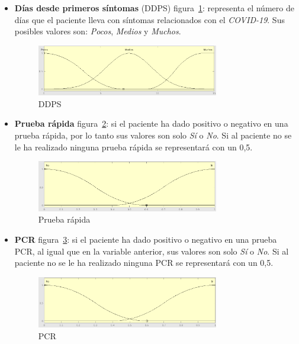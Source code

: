 \documentclass[12pt,a4paper, xcolor=table]{article}
\begin{document}
\begin{itemize}
  \item \textbf{Días desde primeros síntomas} (DDPS) figura~\ref{DDPS}: representa el número de días que el paciente lleva con síntomas relacionados con el \textit{COVID-19}. Sus posibles valores son: \textit{Pocos}, \textit{Medios} y \textit{Muchos}.

  \begin{figure}[!h]
      \centering
      \includegraphics[width=300px]{img/dias_primeros_sintomas.png}
      \caption{DDPS}
      \label{DDPS}
  \end{figure}

  \item \textbf{Prueba rápida} figura~\ref{PR}: si el paciente ha dado positivo o negativo en una prueba rápida, por lo tanto sus valores son solo \textit{Sí} o \textit{No}. Si al paciente no se le ha realizado ninguna prueba rápida se representará con un 0,5.

  \begin{figure}[!h]
      \centering
      \includegraphics[width=300px]{img/prueba_rapida.png}
      \caption{Prueba rápida}
      \label{PR}
  \end{figure}

  \item \textbf{PCR} figura~\ref{PCR}: si el paciente ha dado positivo o negativo en una prueba PCR, al igual que en la variable anterior, sus valores son solo \textit{Sí} o \textit{No}. Si al paciente no se le ha realizado ninguna PCR se representará con un 0,5.

  \clearpage

  \begin{figure}[!h]
      \centering
      \includegraphics[width=300px]{img/PCR.png}
      \caption{PCR}
      \label{PCR}
  \end{figure}


\end{itemize}
\end{document}
